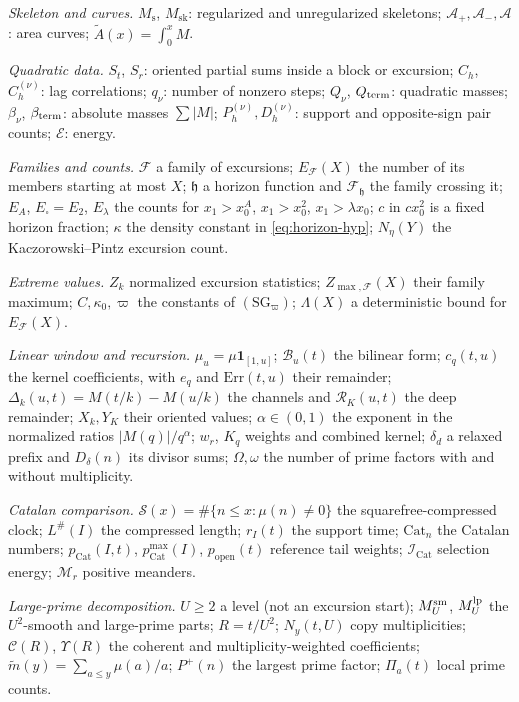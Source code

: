 \documentclass[11pt]{amsart}
\numberwithin{equation}{section}
\theoremstyle{plain}
\theoremstyle{definition}
\theoremstyle{remark}
\newcommand{\Ms}{M_{\mathrm{s}}}
\newcommand{\Msk}{M_{\mathrm{sk}}}
\newcommand{\Ap}{\mathcal{A}_{+}}
\newcommand{\Am}{\mathcal{A}_{-}}
\newcommand{\Anet}{\mathcal{A}}
\newcommand{\Pp}{P^{+}}
\newcommand{\Cc}{\mathcal{C}}
\newcommand{\Sq}{\mathcal{S}}
\newcommand{\En}{\mathcal{E}}
\newcommand{\mt}{\widetilde{m}}
\newcommand{\F}{\mathcal{F}}
\begin{document}
\smallskip
\noindent\emph{Skeleton and curves.}
$\Ms$, $\Msk$: regularized and unregularized skeletons;
$\Ap,\Am,\Anet$: area curves; $\widetilde A(x)=\int_0^xM$.

\smallskip
\noindent\emph{Quadratic data.}
$S_t$, $S_r$: oriented partial sums inside a block or excursion;
$C_h$, $C_h^{(\nu)}$: lag correlations; $q_\nu$: number of nonzero steps;
$Q_\nu$, $Q_{\rm term}$: quadratic masses; $\beta_\nu$, $\beta_{\rm term}$:
absolute masses $\sum|M|$; $P_h^{(\nu)},D_h^{(\nu)}$: support and
opposite-sign pair counts; $\En$: energy.

\smallskip
\noindent\emph{Families and counts.}
$\F$ a family of excursions; $E_\F(X)$ the number of its members starting at
most $X$; $\mathfrak h$ a horizon function and $\F_{\mathfrak h}$ the family
crossing it; $E_A$, $E_\square=E_2$, $E_\lambda$ the counts for
$x_1>x_0^A$, $x_1>x_0^2$, $x_1>\lambda x_0$; $c$ in $cx_0^2$ is a fixed
horizon fraction; $\kappa$ the density constant in \eqref{eq:horizon-hyp};
$N_\eta(Y)$ the Kaczorowski--Pintz excursion count.

\smallskip
\noindent\emph{Extreme values.}
$Z_k$ normalized excursion statistics; $Z_{\max,\F}(X)$ their family maximum;
$C,\kappa_0,\varpi$ the constants of $(\mathrm{SG}_\varpi)$;
$\Lambda(X)$ a deterministic bound for $E_\F(X)$.

\smallskip
\noindent\emph{Linear window and recursion.}
$\mu_u=\mu\mathbf 1_{[1,u]}$; $\mathcal B_u(t)$ the bilinear form;
$c_q(t,u)$ the kernel coefficients, with $e_q$ and $\mathrm{Err}(t,u)$
their remainder; $\Delta_k(u,t)=M(t/k)-M(u/k)$ the channels and
$\mathcal R_K(u,t)$ the deep remainder; $X_k,Y_K$ their oriented values;
$\alpha\in(0,1)$ the exponent in the normalized ratios
$|M(q)|/q^\alpha$; $w_r$, $K_q$ weights and combined kernel;
$\delta_d$ a relaxed prefix and $D_\delta(n)$ its divisor sums;
$\Omega,\omega$ the number of prime factors with and without multiplicity.

\smallskip
\noindent\emph{Catalan comparison.}
$\Sq(x)=\#\{n\le x:\mu(n)\ne0\}$ the squarefree-compressed clock;
$L^\#(I)$ the compressed length; $r_I(t)$ the support time;
$\mathrm{Cat}_n$ the Catalan numbers; $p_{\mathrm{Cat}}(I,t)$,
$p^{\max}_{\mathrm{Cat}}(I)$, $p_{\mathrm{open}}(t)$ reference tail weights;
$\mathcal I_{\mathrm{Cat}}$ selection energy; $\mathcal M_r$ positive meanders.

\smallskip
\noindent\emph{Large-prime decomposition.}
$U\ge2$ a level (not an excursion start); $M^{\rm sm}_U$, $M^{\rm lp}_U$ the
$U^2$-smooth and large-prime parts; $R=t/U^2$; $N_y(t,U)$ copy
multiplicities; $\Cc(R)$, $\Upsilon(R)$ the coherent and multiplicity-weighted
coefficients; $\mt(y)=\sum_{a\le y}\mu(a)/a$; $\Pp(n)$ the largest prime
factor; $\Pi_a(t)$ local prime counts.
\end{document}
